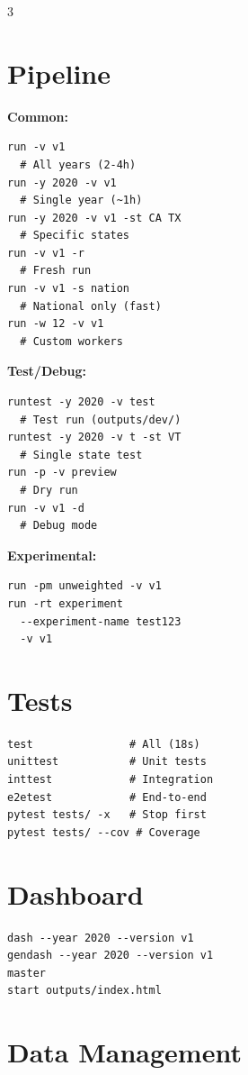 \documentclass[10pt,landscape]{article}
\begin{document}
\begin{multicols}{3}
\raggedright

\section*{Pipeline}

\textbf{Common:}
\begin{Verbatim}[fontsize=\small,frame=single]
run -v v1
  # All years (2-4h)
run -y 2020 -v v1
  # Single year (~1h)
run -y 2020 -v v1 -st CA TX
  # Specific states
run -v v1 -r
  # Fresh run
run -v v1 -s nation
  # National only (fast)
run -w 12 -v v1
  # Custom workers
\end{Verbatim}

\textbf{Test/Debug:}
\begin{Verbatim}[fontsize=\small,frame=single]
runtest -y 2020 -v test
  # Test run (outputs/dev/)
runtest -y 2020 -v t -st VT
  # Single state test
run -p -v preview
  # Dry run
run -v v1 -d
  # Debug mode
\end{Verbatim}

\textbf{Experimental:}
\begin{Verbatim}[fontsize=\small,frame=single]
run -pm unweighted -v v1
run -rt experiment
  --experiment-name test123
  -v v1
\end{Verbatim}

\section*{Tests}

\begin{Verbatim}[fontsize=\small,frame=single]
test               # All (18s)
unittest           # Unit tests
inttest            # Integration
e2etest            # End-to-end
pytest tests/ -x   # Stop first
pytest tests/ --cov # Coverage
\end{Verbatim}

\columnbreak

\section*{Dashboard}

\begin{Verbatim}[fontsize=\small,frame=single]
dash --year 2020 --version v1
gendash --year 2020 --version v1
master
start outputs/index.html
\end{Verbatim}

\section*{Data Management}


\end{multicols}
\end{document}
